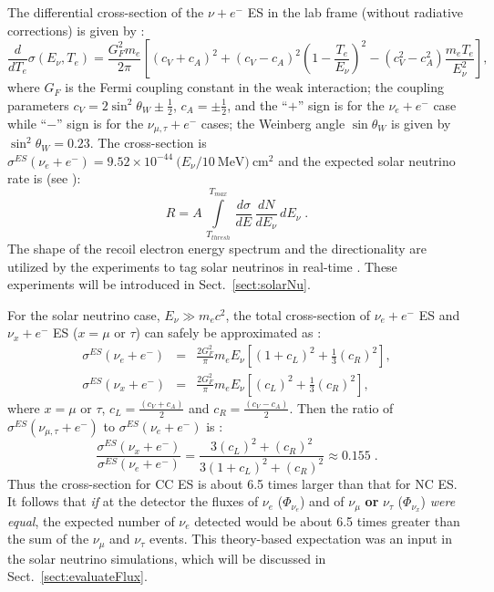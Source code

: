 The differential cross-section of the $\nu+e^-$ ES in the lab frame (without radiative corrections) is given by \cite{giunti2007fundamentals,xing2011neutrinos,suzuki2020sun}:
\begin{equation}
\frac{d}{dT_e}\sigma(E_\nu,T_e)=\frac{G_F^2m_e}{2\pi}\left[(c_V+c_A)^2+(c_V-c_A)^2\left(1-\frac{T_e}{E_\nu}\right)^2-(c_V^2-c_A^2)\frac{m_eT_e}{E_\nu^2}\right],
\end{equation}
where $G_F$ is the Fermi coupling constant in the weak interaction; the coupling parameters $c_V=2\sin^2\theta_W\pm\frac{1}{2}$, $c_A=\pm\frac{1}{2}$, and the ``$+$'' sign is for the $\nu_e+e^-$ case while ``$-$'' sign is for the $\nu_{\mu,\tau}+e^-$ cases; the Weinberg angle $\sin\theta_W$ is given by $\sin^2\theta_W=0.23$. The cross-section is $\sigma^{ES}(\nu_e +e^-)=9.52\times 10^{-44}~(E_\nu/10~\mathrm{MeV)~cm^2}$ and the expected solar neutrino rate is (see \cite{suzuki2020sun}):
\begin{equation}
R=A \, \int\limits_{T_{thresh}}^{T_{max}} \, \frac{d\sigma}{dE} \, \frac{dN}{dE_\nu} \, dE_\nu\; .
\end{equation}
The shape of the recoil electron energy spectrum and the directionality are utilized by the experiments to tag solar neutrinos in real-time \cite{suzuki2020sun}. These experiments will be introduced in Sect.~\ref{sect:solarNu}.

For the solar neutrino case, $E_\nu\gg m_e c^2$, the total cross-section of $\nu_e+e^-$ ES and $\nu_x+e^-$ ES ($x=\mu$ or $\tau$) can safely be approximated as \cite{xing2011neutrinos}:
\begin{eqnarray}
\sigma^{ES}(\nu_e+e^-) &=& \frac{2G_F^2}{\pi}m_e E_\nu \left[(1+c_L)^2+\frac{1}{3}(c_R)^2\right],\\
\sigma^{ES}(\nu_x+e^-) &=& \frac{2G_F^2}{\pi}m_e E_\nu \left[(c_L)^2+\frac{1}{3}(c_R)^2\right],
\end{eqnarray}
where $x=\mu$ or $\tau$, $c_L=\frac{(c_V+c_A)}{2}$ and $c_R = \frac{(c_V-c_A)}{2}$. Then the ratio of $\sigma^{ES}(\nu_{\mu,\tau}+e^-)$ to $\sigma^{ES}(\nu_e+e^-)$ is \cite{xing2011neutrinos}:
\begin{equation}\label{eq:ratio1}
\frac{\sigma^{ES}(\nu_{x}+e^-)}{\sigma^{ES}(\nu_e+e^-)} = \frac{3(c_L)^2+({c_R})^2}{3(1+c_L)^2+(c_R)^2} \approx 0.155 \; .
\end{equation}
Thus the cross-section for CC ES is about 6.5 times larger than that for NC ES. It follows that {\em if} at the detector the fluxes of $\nu_e$ ($\Phi_{\nu_e}$) and of $\nu_{\mu}$ {\bf or} $\nu_\tau$ ($\Phi_{\nu_x}$) {\em were equal}, the expected number of $\nu_e$ detected would be about 6.5 times greater than the sum of the $\nu_{\mu}$ and $\nu_\tau$ events. This theory-based expectation was an input in the solar neutrino simulations, which will be discussed in Sect.~\ref{sect:evaluateFlux}.


